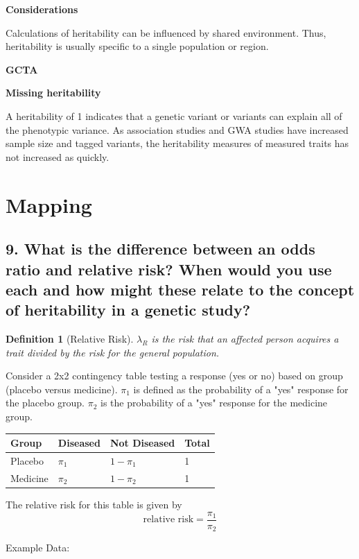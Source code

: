 \documentclass{tufte-handout}
\theoremstyle{noparens}
\newtheorem*{define}{Definition}
\begin{document}
\textbf{Considerations}

Calculations of heritability can be influenced by shared environment. Thus, heritability is usually specific to a single population or region.

\textbf{GCTA}

\textbf{Missing heritability}

A heritability of 1 indicates that a genetic variant or variants can explain all of the phenotypic variance. As association studies and GWA studies have increased sample size and tagged variants, the heritability measures of measured traits has not increased as quickly.

\newpage
\section{Mapping}\label{sec:map}

\subsection{9. What is the difference between an odds ratio and relative risk? When would you use each and how might these relate to the concept of heritability in a genetic study?}

\begin{define}[Relative Risk]
$\lambda_R$ is the risk that an affected person acquires a trait divided by the risk for the general population.
\end{define}

Consider a 2x2 contingency table testing a response (yes or no) based on group (placebo versus medicine). $\pi_1$ is defined as the probability of a "yes" response for the placebo group. $\pi_2$ is the probability of a "yes" response for the medicine group.

\begin{table}
\centering
\begin{tabular}{llll}
\toprule
Group & Diseased & Not Diseased & Total\\
\midrule
Placebo & $\pi_1$ & $1-\pi_1$ & 1\\
Medicine & $\pi_2$ & $1-\pi_2$ & 1\\
\bottomrule
\end{tabular}
\end{table}

The relative risk for this table is given by \[ \text{relative risk} = \frac{\pi_1}{\pi_2} \]

Example Data:
\end{document}
